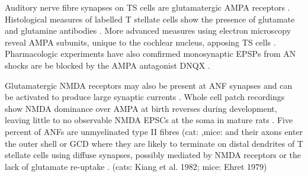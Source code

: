 
 Auditory nerve fibre synapses on TS cells are glutamatergic AMPA receptors
 \citep{FerragamoGoldingEtAl:1998a,WentholdHunterEtAl:1993}.  Histological measures
 of labelled T stellate cells show the presence of glutamate and glutamine antibodies
 \citep{HackneyOsenEtAl:1990,WentholdHunterEtAl:1993}.  More advanced measures using
 electron microscopy reveal AMPA subunits, unique to the cochlear nucleus, apposing
 TS cells \citep{WangWentholdEtAl:1998}.  Pharmacologic experiments have also
 comfirmed monosynaptic EPSPs from AN shocks are be blocked by the AMPA antagonist
 DNQX \citep{FerragamoGoldingEtAl:1998a}. 


 Glutamatergic NMDA receptors may also be present at ANF synapses
 \citep[mice][]{FerragamoGoldingEtAl:1998a} and can be activated to produce large
 synaptic currents \citep{CaoOertel:2010}.  Whole cell patch recordings show NMDA
 dominance over AMPA at birth reverses during development, leaving little to no
 observable NMDA EPSCs at the soma in mature rats \citep{BellinghamLimEtAl:1998}.
 Five percent of ANFs are unmyelinated type II fibres (cat: \citep{KiangRhoEtAl:1982},mice: \citep{Ehret:1979} and their axons enter the
 outer shell or GCD where they are likely to terminate on distal dendrites of T
 stellate cells using diffuse synapses, possibly mediated by NMDA receptors or
 the lack of glutamate re-uptake
 \citep{BensonBrown:2004,Ryugo:2008,RyugoHaenggeliEtAl:2003,RyugoParks:2003}.
 (cats: Kiang et al. 1982; mice: Ehret 1979)

